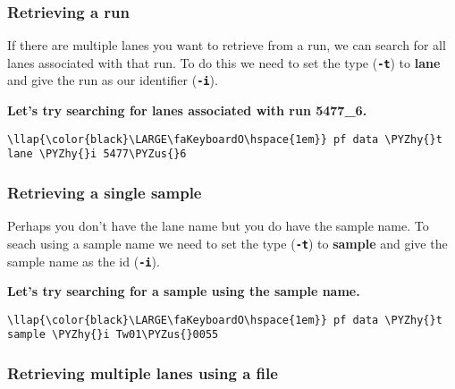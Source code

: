 \documentclass[11pt]{article}
\def\PYZus{\char`\_}
\def\PYZhy{\char`\-}
\begin{document}
    \hypertarget{retrieving-a-run}{%
\subsubsection{Retrieving a run}\label{retrieving-a-run}}

If there are multiple lanes you want to retrieve from a run, we can
search for all lanes associated with that run. To do this we need to set
the type (\textbf{\texttt{-t}}) to \textbf{lane} and give the run as our
identifier (\textbf{\texttt{-i}}).

\textbf{Let's try searching for lanes associated with run 5477\_6.}

\begin{terminalinput}
\begin{Verbatim}[commandchars=\\\{\}]
\llap{\color{black}\LARGE\faKeyboardO\hspace{1em}} pf data \PYZhy{}t lane \PYZhy{}i 5477\PYZus{}6
\end{Verbatim}
\end{terminalinput}

    \hypertarget{retrieving-a-single-sample}{%
\subsubsection{Retrieving a single
sample}\label{retrieving-a-single-sample}}

Perhaps you don't have the lane name but you do have the sample name. To
seach using a sample name we need to set the type (\textbf{\texttt{-t}})
to \textbf{sample} and give the sample name as the id
(\textbf{\texttt{-i}}).

\textbf{Let's try searching for a sample using the sample name.}

\begin{terminalinput}
\begin{Verbatim}[commandchars=\\\{\}]
\llap{\color{black}\LARGE\faKeyboardO\hspace{1em}} pf data \PYZhy{}t sample \PYZhy{}i Tw01\PYZus{}0055
\end{Verbatim}
\end{terminalinput}

    \hypertarget{retrieving-multiple-lanes-using-a-file}{%
\subsubsection{Retrieving multiple lanes using a
file}\label{retrieving-multiple-lanes-using-a-file}}
\end{document}
